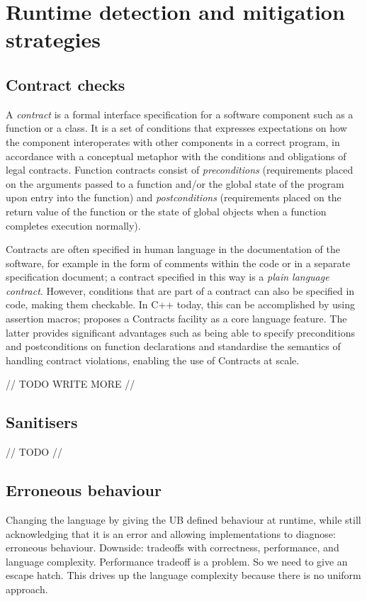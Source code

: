 \section{Runtime detection and mitigation strategies}

\subsection{Contract checks}

A \emph{contract} is a formal interface specification for a software component such as a function or a class. It is a set of conditions that expresses expectations on how the component interoperates with other components in a correct program, in accordance with a conceptual metaphor with the conditions and obligations of legal contracts. Function contracts consist of \emph{preconditions} (requirements placed on the arguments passed to a function and/or the global state of the program upon entry into the function) and \emph{postconditions} (requirements placed on the return value of the function or the state of global objects when a function completes execution normally). 

Contracts are often specified in human language in the documentation of the software, for example in the form of comments within the code or in a separate specification document; a contract specified in this way is a \emph{plain language contract}. However, conditions that are part of a contract can also be specified in code, making them checkable. In C++ today, this can be accomplished by using assertion macros; \cite{P2900R4} proposes a Contracts facility as a core language feature. The latter provides significant advantages such as being able to specify preconditions and postconditions on function declarations and standardise the semantics of handling contract violations, enabling the use of Contracts at scale.

// TODO WRITE MORE //

\subsection{Sanitisers}

// TODO //

\subsection{Erroneous behaviour}

 Changing the language by giving the UB defined behaviour at runtime, while still acknowledging that it is an error and allowing implementations to diagnose: erroneous behaviour. Downside: tradeoffs with correctness, performance, and language complexity. Performance tradeoff is a problem. So we need to give an escape hatch. This drives up the language complexity because there is no uniform approach.
 
